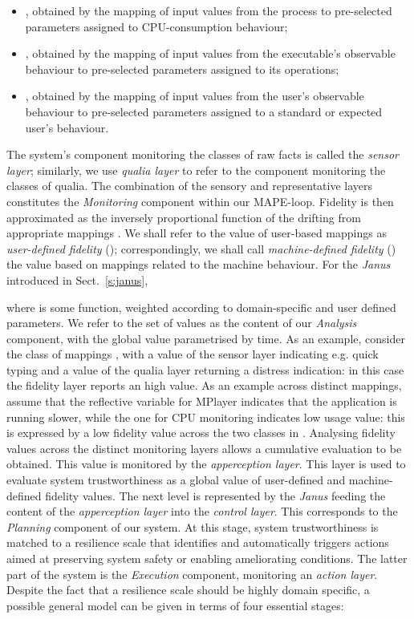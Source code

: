\documentclass{article}
\begin{document}
\begin{itemize}
\item , obtained by the mapping of input values from the  process to pre-selected parameters assigned to CPU-consumption behaviour;
\item , obtained by the mapping of input values from the executable's observable behaviour to pre-selected parameters assigned to its operations;
\item , obtained by the mapping of input values from  the user's observable behaviour to pre-selected parameters assigned to a standard or expected user's behaviour.
\end{itemize}
The system's component monitoring the classes  of raw facts is called the \textit{sensor layer}; similarly, we use \textit{qualia layer} to refer to the component monitoring the classes  of qualia. The combination of the sensory and representative layers constitutes the \textit{Monitoring} component within our MAPE-loop. Fidelity is then approximated as the inversely proportional function of the drifting from appropriate mappings . We shall refer to the value of user-based mappings as \textit{user-defined fidelity} (); correspondingly, we shall call \textit{machine-defined fidelity} () the value based on mappings related to the machine behaviour. For the \textit{Janus} introduced in Sect.~\ref{s:janus}, 



where  is some function, weighted according to domain-specific and user defined parameters. We refer to the set of values  as the content of our \textit{Analysis} component, with the global value  parametrised by time. As an example, consider the class of mappings , with a value of the sensor layer indicating e.g. quick typing and a value of the qualia layer returning a distress indication: in this case the fidelity layer reports an high value. As an example across distinct mappings, assume that the reflective variable for MPlayer indicates that the application is running slower, while the one for CPU monitoring indicates low usage value: this is expressed by a low fidelity value across the two classes in . Analysing fidelity values across the distinct monitoring layers allows a cumulative evaluation to be obtained. This value is monitored by the \textit{apperception layer}. This layer is used to evaluate system trustworthiness as a global value of user-defined and machine-defined fidelity values.
The next level is represented by the \textit{Janus} feeding the content of the \textit{apperception layer} into the \textit{control layer}. This corresponds to the \textit{Planning} component of our system.
At this stage, system trustworthiness is matched to a resilience scale that identifies and automatically triggers actions aimed at preserving system safety or enabling ameliorating conditions. The latter part of the system is the \textit{Execution} component, monitoring an \textit{action layer}.
Despite the fact that a resilience scale should be highly domain specific, a possible general model can be given in terms of four essential stages:
\end{document}
